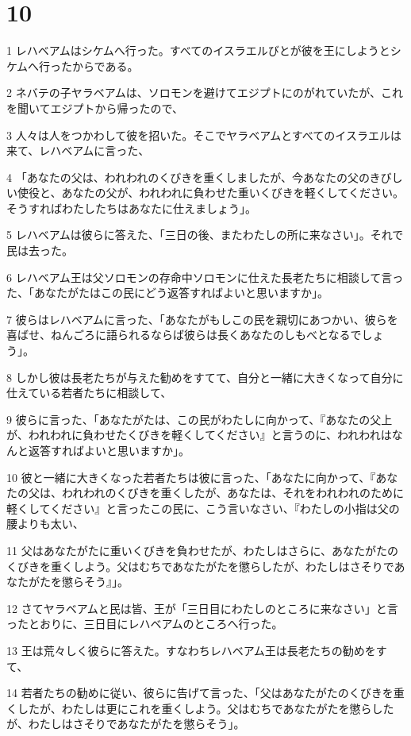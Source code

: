 \chapter{10}

\par 1 レハベアムはシケムへ行った。すべてのイスラエルびとが彼を王にしようとシケムへ行ったからである。
\par 2 ネバテの子ヤラベアムは、ソロモンを避けてエジプトにのがれていたが、これを聞いてエジプトから帰ったので、
\par 3 人々は人をつかわして彼を招いた。そこでヤラベアムとすべてのイスラエルは来て、レハベアムに言った、
\par 4 「あなたの父は、われわれのくびきを重くしましたが、今あなたの父のきびしい使役と、あなたの父が、われわれに負わせた重いくびきを軽くしてください。そうすればわたしたちはあなたに仕えましょう」。
\par 5 レハベアムは彼らに答えた、「三日の後、またわたしの所に来なさい」。それで民は去った。
\par 6 レハベアム王は父ソロモンの存命中ソロモンに仕えた長老たちに相談して言った、「あなたがたはこの民にどう返答すればよいと思いますか」。
\par 7 彼らはレハベアムに言った、「あなたがもしこの民を親切にあつかい、彼らを喜ばせ、ねんごろに語られるならば彼らは長くあなたのしもべとなるでしょう」。
\par 8 しかし彼は長老たちが与えた勧めをすてて、自分と一緒に大きくなって自分に仕えている若者たちに相談して、
\par 9 彼らに言った、「あなたがたは、この民がわたしに向かって、『あなたの父上が、われわれに負わせたくびきを軽くしてください』と言うのに、われわれはなんと返答すればよいと思いますか」。
\par 10 彼と一緒に大きくなった若者たちは彼に言った、「あなたに向かって、『あなたの父は、われわれのくびきを重くしたが、あなたは、それをわれわれのために軽くしてください』と言ったこの民に、こう言いなさい、『わたしの小指は父の腰よりも太い、
\par 11 父はあなたがたに重いくびきを負わせたが、わたしはさらに、あなたがたのくびきを重くしよう。父はむちであなたがたを懲らしたが、わたしはさそりであなたがたを懲らそう』」。
\par 12 さてヤラベアムと民は皆、王が「三日目にわたしのところに来なさい」と言ったとおりに、三日目にレハベアムのところへ行った。
\par 13 王は荒々しく彼らに答えた。すなわちレハベアム王は長老たちの勧めをすて、
\par 14 若者たちの勧めに従い、彼らに告げて言った、「父はあなたがたのくびきを重くしたが、わたしは更にこれを重くしよう。父はむちであなたがたを懲らしたが、わたしはさそりであなたがたを懲らそう」。
